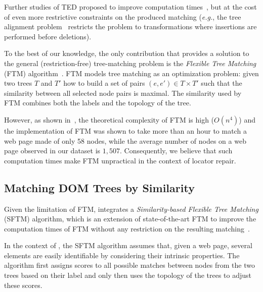 \documentclass[preprint, 12pt]{elsarticle}
\begin{document}
Further studies of TED proposed to improve computation times~\cite{jiang1995alignment, valiente2001efficient, zhang1996constrained}, but at the cost of even more restrictive constraints on the produced matching (\emph{e.g.}, the tree alignment problem~\cite{jiang1995alignment} restricts the problem to transformations where insertions are performed before deletions).

To the best of our knowledge, the only contribution that provides a solution to the general (restriction-free) tree-matching problem is the \emph{Flexible Tree Matching} (FTM) algorithm~\cite{Kumar2011_FTM}.
FTM models tree matching as an optimization problem: given two trees $T$ and $T'$ how to build a set of pairs $(e,e') \in T \times T'$ such that the similarity between all selected node pairs is maximal.
The similarity used by FTM combines both the labels and the topology of the tree.

However, as shown in~\cite{brisset2020sftm}, the theoretical complexity of FTM is high ($O(n^4)$) and the implementation of FTM was shown to take more than an hour to match a web page made of only 58 nodes, while the average number of nodes on a web page observed in our dataset is $1,507$.
Consequently, we believe that such computation times make FTM unpractical in the context of locator repair.


\subsection{Matching DOM Trees by Similarity}\label{sec:SFTM}
Given the limitation of FTM, \erratum{} integrates a \emph{Similarity-based Flexible Tree Matching} (SFTM) algorithm, which is an extension of state-of-the-art FTM to improve the computation times of FTM without any restriction on the resulting matching~\cite{brisset2020sftm}. 

In the context of \erratum{}, the SFTM algorithm assumes that, given a web page, several elements are easily identifiable by considering their intrinsic properties.
The algorithm first assigns scores to all possible matches between nodes from the two trees based on their label and only then uses the topology of the trees to adjust these scores.
\end{document}
